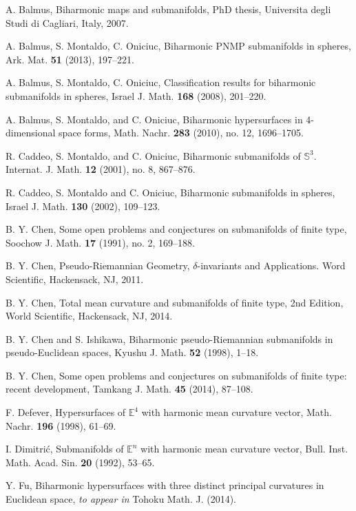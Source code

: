 \documentclass[twoside,reqno,A4]{amsart}
\theoremstyle{definition}
\theoremstyle{remark}
\numberwithin{equation}{section}
\begin{document}
\begin{thebibliography}{[1]}
A. Balmus, Biharmonic maps and submanifolds, PhD thesis, Universita
degli Studi di Cagliari, Italy, 2007.

A. Balmus, S. Montaldo, C. Oniciuc, Biharmonic PNMP submanifolds in
spheres, Ark. Mat. \textbf{51} (2013), 197--221.

A. Balmus, S. Montaldo, C. Oniciuc, Classification results for
biharmonic submanifolds in spheres, Israel J. Math. \textbf{168}
(2008), 201--220.

 A. Balmus, S. Montaldo, and C. Oniciuc, Biharmonic hypersurfaces in 4-dimensional space forms, Math.
Nachr. \textbf{283} (2010), no. 12, 1696--1705.

 R. Caddeo, S.  Montaldo, and C. Oniciuc, Biharmonic submanifolds of
$\mathbb S^3$. Internat. J. Math. \textbf{12} (2001), no. 8,
867--876.

 R. Caddeo, S. Montaldo and C. Oniciuc, Biharmonic submanifolds in spheres,
 Israel J. Math. \textbf{130} (2002), 109--123.

 B. Y. Chen, Some open problems and conjectures on submanifolds of finite
type, Soochow J. Math. \textbf{17} (1991), no. 2, 169--188.

B. Y. Chen, Pseudo-Riemannian Geometry, $\delta$-invariants and
Applications. Word Scientific, Hackensack, NJ, 2011.

B. Y. Chen, Total mean curvature and submanifolds of finite type,
2nd Edition, World Scientific, Hackensack, NJ, 2014.

B. Y. Chen and S. Ishikawa, Biharmonic pseudo-Riemannian
submanifolds in pseudo-Euclidean spaces, Kyushu J. Math. \textbf{52}
(1998), 1--18.

B. Y. Chen, Some open problems and conjectures on submanifolds of
finite type: recent development, Tamkang J. Math. \textbf{45}
(2014), 87--108.

 F. Defever, Hypersurfaces of $\mathbb E^4$ with harmonic mean curvature
vector, Math. Nachr. \textbf{196} (1998), 61--69.

I. Dimitri\'{c}, Submanifolds of $\mathbb E^n$ with harmonic mean
curvature vector, Bull. Inst. Math. Acad. Sin. \textbf{20} (1992),
53--65.

Y. Fu, Biharmonic hypersurfaces with three distinct principal
curvatures in Euclidean space, {\em to appear in} Tohoku Math. J.
(2014).


\end{thebibliography}
\end{document}
